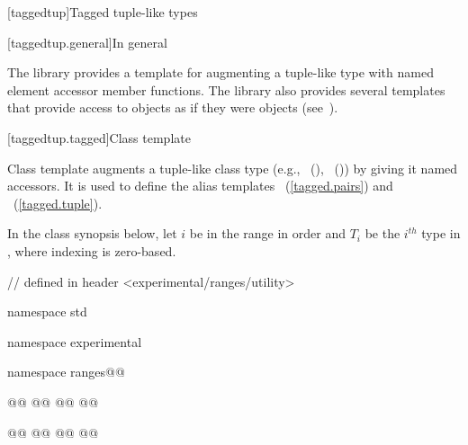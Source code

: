 {\color{addclr}
[taggedtup]{Tagged tuple-like types}

[taggedtup.general]{In general}

\pnum The library provides a template for augmenting a tuple-like type with named element accessor
member functions. The library also provides several templates that provide access to 
objects as if they were  objects (see~).


[taggedtup.tagged]{Class template }

\pnum
Class template  augments a tuple-like class type (e.g., ~(),
~()) by giving it named accessors. It is used to define the alias
templates ~(\ref{tagged.pairs}) and
~(\ref{tagged.tuple}).

\pnum In the class synopsis below, let $i$ be in the range
 in order and $T_i$ be the $i^{th}$ type in , where indexing
is zero-based.

%
\begin{codeblock}
// defined in header <experimental/ranges/utility>

namespace std { namespace experimental { namespace ranges@@ {
  @@
  @@
    @@
  @\newtxt{\}}@

  @@
  @@
    @@
  @\newtxt{\}}@

}}}
\end{codeblock}}
